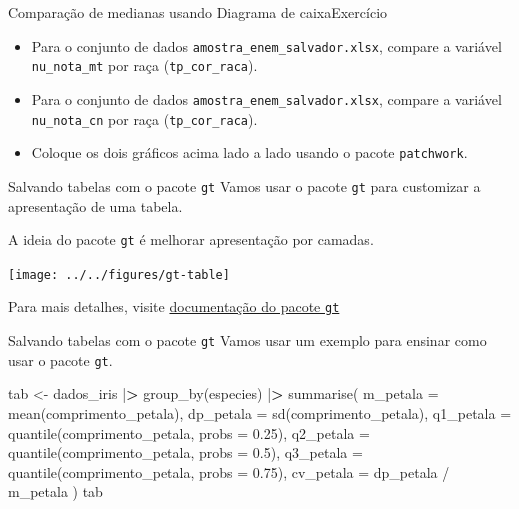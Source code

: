 \documentclass[
  10pt,
  ignorenonframetext,
]{beamer}
\newenvironment{Shaded}{}{}
\newcommand{\DataTypeTok}[1]{#1}
\newcommand{\ErrorTok}[1]{\textcolor[rgb]{1.00,0.00,0.00}{\textbf{#1}}}
\newcommand{\FloatTok}[1]{#1}
\newcommand{\KeywordTok}[1]{\textcolor[rgb]{0.00,0.00,1.00}{#1}}
\newcommand{\NormalTok}[1]{#1}
\newcommand{\OperatorTok}[1]{#1}
\newcommand{\StringTok}[1]{\textcolor[rgb]{0.00,0.50,0.50}{#1}}
\providecommand{\tightlist}{%
  \setlength{\itemsep}{0pt}\setlength{\parskip}{0pt}}
\begin{document}
\begin{frame}[fragile]{Comparação de medianas usando Diagrama de
caixa\newline Exercício}
\protect\hypertarget{comparauxe7uxe3o-de-medianas-usando-diagrama-de-caixaexercuxedcio}{}
\begin{itemize}
\tightlist
\item
  Para o conjunto de dados \texttt{amostra\_enem\_salvador.xlsx},
  compare a variável \texttt{nu\_nota\_mt} por raça
  (\texttt{tp\_cor\_raca}).
\item
  Para o conjunto de dados \texttt{amostra\_enem\_salvador.xlsx},
  compare a variável \texttt{nu\_nota\_cn} por raça
  (\texttt{tp\_cor\_raca}).
\item
  Coloque os dois gráficos acima lado a lado usando o pacote
  \texttt{patchwork}.
\end{itemize}
\end{frame}

\begin{frame}[fragile]{Salvando tabelas com o pacote \texttt{gt}}
\protect\hypertarget{salvando-tabelas-com-o-pacote-gt}{}
Vamos usar o pacote \texttt{gt} para customizar a apresentação de uma
tabela.

A ideia do pacote \texttt{gt} é melhorar apresentação por camadas.

\begin{center}\texttt{[image: ../../figures/gt-table]} \end{center}

Para mais detalhes, visite \href{https://gt.rstudio.com/}{documentação
do pacote \texttt{gt}}
\end{frame}

\begin{frame}[fragile]{Salvando tabelas com o pacote \texttt{gt}}
\protect\hypertarget{salvando-tabelas-com-o-pacote-gt-1}{}
Vamos usar um exemplo para ensinar como usar o pacote \texttt{gt}.

\small

\begin{Shaded}
\begin{Highlighting}[]
\NormalTok{tab \textless{}{-}}\StringTok{ }\NormalTok{dados\_iris }\OperatorTok{|}\ErrorTok{\textgreater{}}
\StringTok{  }\KeywordTok{group\_by}\NormalTok{(especies) }\OperatorTok{|}\ErrorTok{\textgreater{}}
\StringTok{  }\KeywordTok{summarise}\NormalTok{(}
    \DataTypeTok{m\_petala =} \KeywordTok{mean}\NormalTok{(comprimento\_petala),}
    \DataTypeTok{dp\_petala =} \KeywordTok{sd}\NormalTok{(comprimento\_petala),}
    \DataTypeTok{q1\_petala =} \KeywordTok{quantile}\NormalTok{(comprimento\_petala, }\DataTypeTok{probs =} \FloatTok{0.25}\NormalTok{),}
    \DataTypeTok{q2\_petala =} \KeywordTok{quantile}\NormalTok{(comprimento\_petala, }\DataTypeTok{probs =} \FloatTok{0.5}\NormalTok{),}
    \DataTypeTok{q3\_petala =} \KeywordTok{quantile}\NormalTok{(comprimento\_petala, }\DataTypeTok{probs =} \FloatTok{0.75}\NormalTok{),}
    \DataTypeTok{cv\_petala =}\NormalTok{ dp\_petala }\OperatorTok{/}\StringTok{ }\NormalTok{m\_petala}
\NormalTok{  )}
\NormalTok{tab}
\end{Highlighting}
\end{Shaded}
\end{frame}
\end{document}
